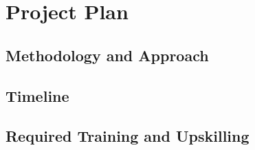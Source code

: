 \chapter{Project Plan}\label{ch:plan}

\section{Methodology and Approach}

\section{Timeline}

\section{Required Training and Upskilling}

